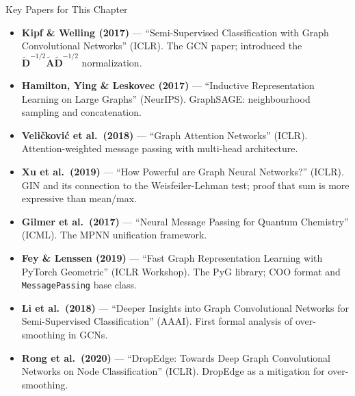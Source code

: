 \begin{paperbox}{Key Papers for This Chapter}
\begin{itemize}
    \item \textbf{Kipf \& Welling (2017)} --- ``Semi-Supervised Classification with Graph Convolutional Networks'' (ICLR). The GCN paper; introduced the $\tilde{\mathbf{D}}^{-1/2}\tilde{\mathbf{A}}\tilde{\mathbf{D}}^{-1/2}$ normalization.
    \item \textbf{Hamilton, Ying \& Leskovec (2017)} --- ``Inductive Representation Learning on Large Graphs'' (NeurIPS). GraphSAGE: neighbourhood sampling and concatenation.
    \item \textbf{Veli{\v{c}}kovi{\'c} et al.\ (2018)} --- ``Graph Attention Networks'' (ICLR). Attention-weighted message passing with multi-head architecture.
    \item \textbf{Xu et al.\ (2019)} --- ``How Powerful are Graph Neural Networks?'' (ICLR). GIN and its connection to the Weisfeiler-Lehman test; proof that sum is more expressive than mean/max.
    \item \textbf{Gilmer et al.\ (2017)} --- ``Neural Message Passing for Quantum Chemistry'' (ICML). The MPNN unification framework.
    \item \textbf{Fey \& Lenssen (2019)} --- ``Fast Graph Representation Learning with PyTorch Geometric'' (ICLR Workshop). The PyG library; COO format and \texttt{MessagePassing} base class.
    \item \textbf{Li et al.\ (2018)} --- ``Deeper Insights into Graph Convolutional Networks for Semi-Supervised Classification'' (AAAI). First formal analysis of over-smoothing in GCNs.
    \item \textbf{Rong et al.\ (2020)} --- ``DropEdge: Towards Deep Graph Convolutional Networks on Node Classification'' (ICLR). DropEdge as a mitigation for over-smoothing.
\end{itemize}
\end{paperbox}
